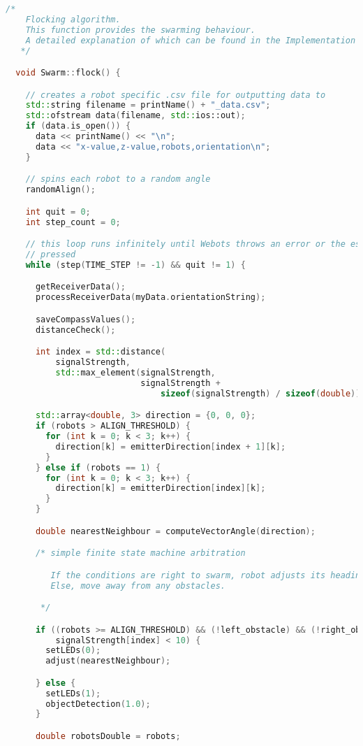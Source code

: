 \begin{lstlisting}[language=C++, caption={swarm.cpp},label={lst:swarm-header}]
  /*
    Flocking algorithm.
    This function provides the swarming behaviour.
    A detailed explanation of which can be found in the Implementation section.
   */

  void Swarm::flock() {

    // creates a robot specific .csv file for outputting data to
    std::string filename = printName() + "_data.csv";
    std::ofstream data(filename, std::ios::out);
    if (data.is_open()) {
      data << printName() << "\n";
      data << "x-value,z-value,robots,orientation\n";
    }

    // spins each robot to a random angle
    randomAlign();

    int quit = 0;
    int step_count = 0;

    // this loop runs infinitely until Webots throws an error or the escape key is
    // pressed
    while (step(TIME_STEP != -1) && quit != 1) {

      getReceiverData();
      processReceiverData(myData.orientationString);

      saveCompassValues();
      distanceCheck();

      int index = std::distance(
          signalStrength,
          std::max_element(signalStrength,
                           signalStrength +
                               sizeof(signalStrength) / sizeof(double)));

      std::array<double, 3> direction = {0, 0, 0};
      if (robots > ALIGN_THRESHOLD) {
        for (int k = 0; k < 3; k++) {
          direction[k] = emitterDirection[index + 1][k];
        }
      } else if (robots == 1) {
        for (int k = 0; k < 3; k++) {
          direction[k] = emitterDirection[index][k];
        }
      }

      double nearestNeighbour = computeVectorAngle(direction);

      /* simple finite state machine arbitration

         If the conditions are right to swarm, robot adjusts its heading.
         Else, move away from any obstacles.

       */

      if ((robots >= ALIGN_THRESHOLD) && (!left_obstacle) && (!right_obstacle) &&
          signalStrength[index] < 10) {
        setLEDs(0);
        adjust(nearestNeighbour);

      } else {
        setLEDs(1);
        objectDetection(1.0);
      }

      double robotsDouble = robots;


\end{lstlisting}

